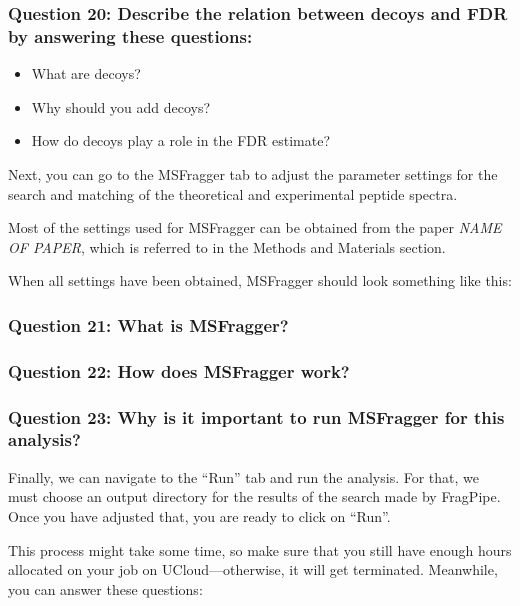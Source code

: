 \documentclass[
  letterpaper,
  DIV=11,
  numbers=noendperiod]{scrartcl}
\providecommand{\tightlist}{%
  \setlength{\itemsep}{0pt}\setlength{\parskip}{0pt}}\usepackage{longtable,booktabs,array}
\begin{document}
\subsubsection{Question 20: Describe the relation between decoys and FDR
by answering these
questions:}\label{question-20-describe-the-relation-between-decoys-and-fdr-by-answering-these-questions}

\begin{itemize}
\tightlist
\item
  What are decoys?
\item
  Why should you add decoys?
\item
  How do decoys play a role in the FDR estimate?
\end{itemize}

Next, you can go to the MSFragger tab to adjust the parameter settings
for the search and matching of the theoretical and experimental peptide
spectra.

Most of the settings used for MSFragger can be obtained from the paper
\emph{NAME OF PAPER}, which is referred to in the Methods and Materials
section.

When all settings have been obtained, MSFragger should look something
like this:

\subsubsection{Question 21: What is
MSFragger?}\label{question-21-what-is-msfragger}

\subsubsection{Question 22: How does MSFragger
work?}\label{question-22-how-does-msfragger-work}

\subsubsection{Question 23: Why is it important to run MSFragger for
this
analysis?}\label{question-23-why-is-it-important-to-run-msfragger-for-this-analysis}

Finally, we can navigate to the ``Run'' tab and run the analysis. For
that, we must choose an output directory for the results of the search
made by FragPipe. Once you have adjusted that, you are ready to click on
``Run''.

This process might take some time, so make sure that you still have
enough hours allocated on your job on UCloud---otherwise, it will get
terminated. Meanwhile, you can answer these questions:
\end{document}
